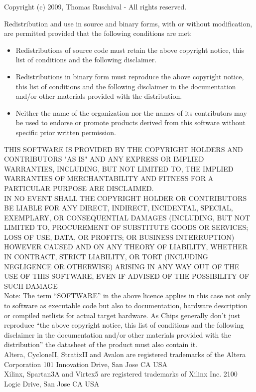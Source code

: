 \documentclass{ruschidoc}
\begin{document}
Copyright (c) 2009, Thomas Ruschival - All rights reserved.

Redistribution and use in source and binary forms, with or without modification, are
permitted provided that the following conditions are met:
\begin{itemize}
\item Redistributions of source code must retain the above copyright notice, this
  list of conditions and the following disclaimer.
\item Redistributions in binary form must reproduce the above copyright notice, this
  list of conditions and the following disclaimer in the documentation and/or other
  materials provided with the distribution.
\item Neither the name of the organization nor the names of its contributors may be
  used to endorse or promote products derived from this software without specific
  prior written permission.
\end{itemize}
 THIS SOFTWARE IS PROVIDED BY THE COPYRIGHT HOLDERS AND CONTRIBUTORS "AS IS"
 AND ANY EXPRESS OR IMPLIED WARRANTIES, INCLUDING, BUT NOT LIMITED TO, THE
 IMPLIED WARRANTIES OF MERCHANTABILITY AND FITNESS FOR A PARTICULAR PURPOSE
 ARE DISCLAIMED. \\
IN NO EVENT SHALL THE COPYRIGHT HOLDER OR CONTRIBUTORS BE
 LIABLE FOR ANY DIRECT, INDIRECT, INCIDENTAL, SPECIAL, EXEMPLARY,
 OR CONSEQUENTIAL DAMAGES (INCLUDING, BUT NOT LIMITED TO, PROCUREMENT OF
 SUBSTITUTE GOODS OR SERVICES; LOSS OF USE, DATA, OR PROFITS; OR BUSINESS
 INTERRUPTION) HOWEVER CAUSED AND ON ANY THEORY OF LIABILITY, WHETHER IN
 CONTRACT, STRICT LIABILITY, OR TORT (INCLUDING NEGLIGENCE OR OTHERWISE)
 ARISING IN ANY WAY OUT OF THE USE OF THIS SOFTWARE, EVEN IF ADVISED OF
 THE POSSIBILITY OF SUCH DAMAGE\\

 Note: The term ``SOFTWARE'' in the above licence applies in this case not only to
 software as executable code but also to documentation, hardware description or
 compiled netlists for actual target hardware. As Chips generally don't just
 reproduce ``the above copyright notice, this list of conditions and the following
 disclaimer in the documentation and/or other materials provided with the
 distribution'' the datasheet of the product must also contain it.\\

Altera, CycloneII, StratixII and Avalon are registered trademarks of the Altera Corporation
  101 Innovation Drive, San Jose CA USA \\
 Xilinx, Spartan3A and Virtex5 are registered trademarks of Xilinx Inc. 2100 Logic Drive, San Jose CA USA 

\newpage

\printacronym
\printglossary


\revisionTable
\end{document}
